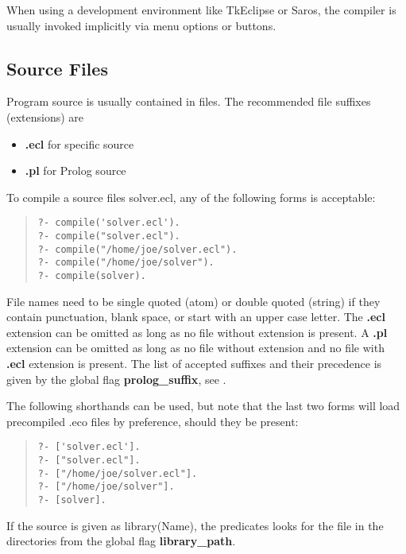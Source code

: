 When using a development environment like
TkEclipse or Saros, the compiler is usually invoked implicitly via
menu options or buttons.

\subsection{Source Files}

Program source is usually contained in files.  The recommended file
suffixes (extensions) are
\begin{itemize}
\item {\bf .ecl} for {\eclipse} specific source
\item {\bf .pl} for Prolog source
\end{itemize}
To compile a source files solver.ecl, any of the following forms is
acceptable:
\begin{quote}\begin{verbatim}
?- compile('solver.ecl').
?- compile("solver.ecl").
?- compile("/home/joe/solver.ecl").
?- compile("/home/joe/solver").
?- compile(solver).
\end{verbatim}
\end{quote}
File names need to be single quoted (atom) or double quoted (string)
if they contain punctuation, blank space, or start with an upper case letter.
The {\bf .ecl} extension can be omitted as long as no file without extension
is present. A {\bf .pl} extension can be omitted as long as no file without
extension and no file with {\bf .ecl} extension is present. The list of
accepted suffixes and their precedence is given by the global flag
{\bf prolog_suffix}, see
.

The following shorthands can be used, but note that the last two forms
will load precompiled .eco files by preference, should they be present:
\begin{quote}\begin{verbatim}
?- ['solver.ecl'].
?- ["solver.ecl"].
?- ["/home/joe/solver.ecl"].
?- ["/home/joe/solver"].
?- [solver].
\end{verbatim}
\end{quote}

If the source is given as library(Name), the predicates looks for the file
in the directories from the global flag {\bf library_path}.

